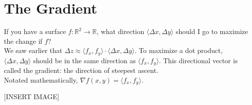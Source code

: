 \section{The Gradient}
\noindent
If you have a surface $f:\mathbb{R}^2\to\mathbb{R}$, what direction $\langle \Delta x, \Delta y\rangle$ should I go to maximize the change if $f$?\\
We saw earlier that $\Delta z\approx \langle f_x,f_y\rangle\cdot\langle\Delta x, \Delta y\rangle$. To maximize a dot product, $\langle \Delta x, \Delta y\rangle$ should be in the same direction as $\langle f_x, f_y\rangle$. This directional vector is called the gradient: the direction of steepest ascent.\\
Notated mathematically, $\nabla f(x,y) = \langle f_x, f_y\rangle$.

[INSERT IMAGE]



